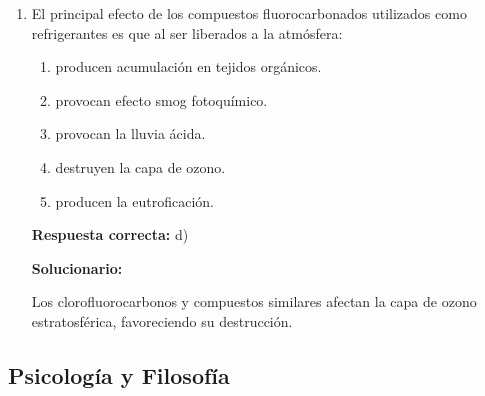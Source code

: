 \begin{enumerate}[resume]
	\item El principal efecto de los compuestos fluorocarbonados utilizados como refrigerantes es que al ser liberados a la atmósfera:
	\begin{enumerate}[label=\alph*)]
		\item producen acumulación en tejidos orgánicos.
		\item provocan efecto smog fotoquímico.
		\item provocan la lluvia ácida.
		\item destruyen la capa de ozono.
		\item producen la eutroficación.
	\end{enumerate}
	\textbf{Respuesta correcta:} d)
	
	\vspace{2mm}
	\textbf{Solucionario:}
	
	Los clorofluorocarbonos y compuestos similares afectan la capa de ozono estratosférica, favoreciendo su destrucción.
	
	\vspace{6mm}
	
\end{enumerate}

\subsection*{Psicología y Filosofía}

